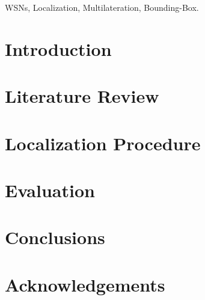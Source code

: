 \documentclass[conference]{IEEEtran}
\begin{document}
\begin{IEEEkeywords}
WSNs, Localization, Multilateration, Bounding-Box.
\end{IEEEkeywords}

% 
% 


\section{Introduction} \label{introduction}
  

\section{Literature Review} \label{literature}
  

\section{Localization Procedure} \label{locProc}
  

\section{Evaluation} \label{simulation}
  

\section{Conclusions} \label{conclusions}
  
  
\section{Acknowledgements} \label{ack}
  



\end{document}
